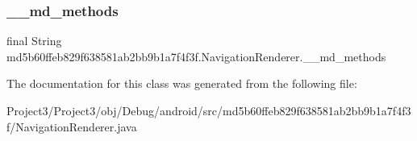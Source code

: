 \subsubsection{\texorpdfstring{\+\_\+\+\_\+md\+\_\+methods}{\_\_md\_methods}}
{\footnotesize\ttfamily final String md5b60ffeb829f638581ab2bb9b1a7f4f3f.\+Navigation\+Renderer.\+\_\+\+\_\+md\+\_\+methods\hspace{0.3cm}{\ttfamily [static]}}



The documentation for this class was generated from the following file\+:\begin{DoxyCompactItemize}
\item 
Project3/\+Project3/obj/\+Debug/android/src/md5b60ffeb829f638581ab2bb9b1a7f4f3f/Navigation\+Renderer.\+java\end{DoxyCompactItemize}
